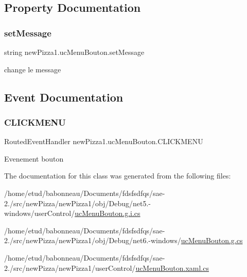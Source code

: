 \subsection{Property Documentation}
\mbox{\label{classnewPizza1_1_1ucMenuBouton_ac3b1d4595f7f898a96f4ff255c16b1ae}} 
\subsubsection{\texorpdfstring{set\+Message}{setMessage}}
{\footnotesize\ttfamily string new\+Pizza1.\+uc\+Menu\+Bouton.\+set\+Message\hspace{0.3cm}{\ttfamily [set]}}



change le message 



\subsection{Event Documentation}
\mbox{\label{classnewPizza1_1_1ucMenuBouton_a2f8676c103816d8ba83b0536d1f27195}} 
\subsubsection{\texorpdfstring{C\+L\+I\+C\+K\+M\+E\+NU}{CLICKMENU}}
{\footnotesize\ttfamily Routed\+Event\+Handler new\+Pizza1.\+uc\+Menu\+Bouton.\+C\+L\+I\+C\+K\+M\+E\+NU}



Evenement bouton 



The documentation for this class was generated from the following files\+:\begin{DoxyCompactItemize}
\item 
/home/etud/babonneau/\+Documents/fdsfsdfqs/sae-\/2./src/new\+Pizza/new\+Pizza1/obj/\+Debug/net5.-\/windows/user\+Control/\hyperlink{net5_80-windows_2userControl_2ucMenuBouton_8g_8i_8cs}{uc\+Menu\+Bouton.\+g.\+i.\+cs}\item 
/home/etud/babonneau/\+Documents/fdsfsdfqs/sae-\/2./src/new\+Pizza/new\+Pizza1/obj/\+Debug/net6.-\/windows/\hyperlink{Debug_2net6_80-windows_2ucMenuBouton_8g_8cs}{uc\+Menu\+Bouton.\+g.\+cs}\item 
/home/etud/babonneau/\+Documents/fdsfsdfqs/sae-\/2./src/new\+Pizza/new\+Pizza1/user\+Control/\hyperlink{ucMenuBouton_8xaml_8cs}{uc\+Menu\+Bouton.\+xaml.\+cs}\end{DoxyCompactItemize}
